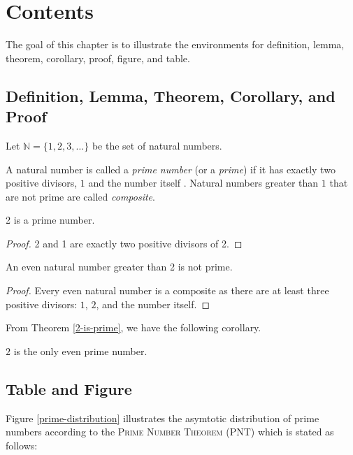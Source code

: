 \chapter{Contents}
\setlength{\parskip}{12pt}
\setlength{\parindent}{10mm} 
\onehalfspacing

The goal of this chapter is to illustrate the environments for definition, lemma, theorem, corollary, proof, figure, and table.

\section{Definition, Lemma, Theorem, Corollary, and Proof}
Let $\mathbb{N} = \{1, 2, 3, \ldots \}$ be the set of natural numbers.

\begin{definition}
\label{primes and composits}
A natural number is called a {\em prime number} (or a {\em prime}) if it has exactly two positive divisors, $1$ and the number itself \cite{numbertheory-underwoord}.  Natural numbers greater than $1$ that are not prime are called {\em composite}.
\end{definition}

\begin{lemma}[2 is prime]
\label{2-is-prime} 
2 is a prime number.
\end{lemma}

\begin{proof}
2 and 1 are exactly two positive divisors of 2.
\end{proof}

\begin{theorem}
\label{2-is-prime} 
An even natural number greater than 2 is not prime.
\end{theorem}

\begin{proof}
Every even natural number is a composite as there are at least three positive divisors: $1$, $2$, and the number itself.
\end{proof}

From Theorem \ref{2-is-prime}, we have the following corollary.

\begin{corollary}
$2$ is the only even prime number.
\end{corollary}

\section{Table and Figure}
Figure \ref{prime-distribution} illustrates the asymtotic distribution of prime numbers according to the \textsc{Prime Number Theorem (PNT)} which is stated as follows:

